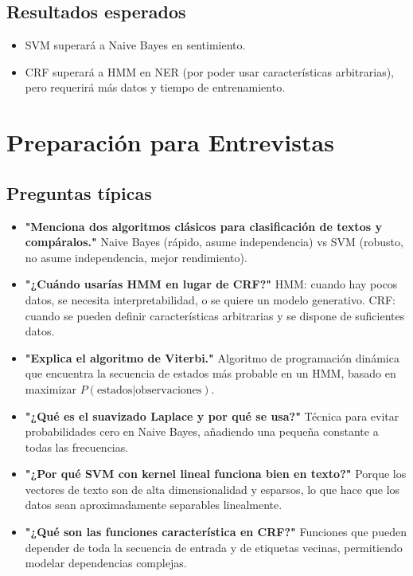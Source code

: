 \documentclass[12pt,a4paper,openany,oneside]{book}
\begin{document}
\subsection{Resultados esperados}
\begin{itemize}
    \item SVM superará a Naive Bayes en sentimiento.
    \item CRF superará a HMM en NER (por poder usar características arbitrarias), pero requerirá más datos y tiempo de entrenamiento.
\end{itemize}

\section{Preparación para Entrevistas}

\subsection{Preguntas típicas}
\begin{itemize}
    \item \textbf{"Menciona dos algoritmos clásicos para clasificación de textos y compáralos."}
    Naive Bayes (rápido, asume independencia) vs SVM (robusto, no asume independencia, mejor rendimiento).
    
    \item \textbf{"¿Cuándo usarías HMM en lugar de CRF?"}
    HMM: cuando hay pocos datos, se necesita interpretabilidad, o se quiere un modelo generativo. CRF: cuando se pueden definir características arbitrarias y se dispone de suficientes datos.
    
    \item \textbf{"Explica el algoritmo de Viterbi."}
    Algoritmo de programación dinámica que encuentra la secuencia de estados más probable en un HMM, basado en maximizar \(P(\text{estados}|\text{observaciones})\).
    
    \item \textbf{"¿Qué es el suavizado Laplace y por qué se usa?"}
    Técnica para evitar probabilidades cero en Naive Bayes, añadiendo una pequeña constante a todas las frecuencias.
    
    \item \textbf{"¿Por qué SVM con kernel lineal funciona bien en texto?"}
    Porque los vectores de texto son de alta dimensionalidad y esparsos, lo que hace que los datos sean aproximadamente separables linealmente.
    
    \item \textbf{"¿Qué son las funciones característica en CRF?"}
    Funciones que pueden depender de toda la secuencia de entrada y de etiquetas vecinas, permitiendo modelar dependencias complejas.
\end{itemize}
\end{document}
